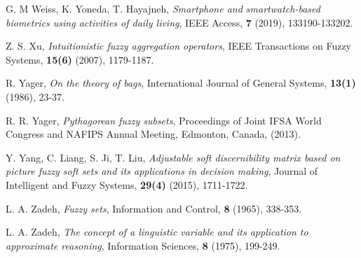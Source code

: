 \documentclass{IJFS}
\begin{document}
\begin{thebibliography}{1}
 G. M Weiss, K. Yoneda, T. Hayajneh, {\it Smartphone and smartwatch-based biometrics using activities of daily living}, IEEE Access, {\bf 7} (2019), 133190-133202.


 Z. S. Xu, {\it Intuitionistic fuzzy aggregation operators}, IEEE Transactions on Fuzzy Systems, {\bf 15(6)} (2007), 1179-1187.


 R. Yager, {\it On the theory of bags}, International Journal of General Systems, {\bf 13(1)} (1986), 23-37.


 R. R.  Yager, {\it Pythagorean fuzzy subsets}, Proceedings of Joint
IFSA World Congress and NAFIPS Annual Meeting, Edmonton, Canada,
(2013).

 Y. Yang, C. Liang, S. Ji, T. Liu, {\it Adjustable soft discernibility matrix based
on picture fuzzy soft sets and its applications in decision
making}, Journal of Intelligent and Fuzzy Systems, {\bf 29(4)} (2015),
1711-1722.

 L. A. Zadeh, {\it Fuzzy sets}, Information and Control, {\bf 8} (1965), 338-353.

 L. A. Zadeh, {\it The concept of a linguistic variable and its
application to approximate reasoning}, Information Sciences, {\bf 8} (1975),
199-249.

\end{thebibliography}
\end{document}
